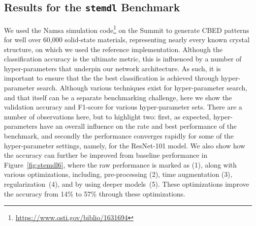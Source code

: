 \subsection{Results for the {\tt stemdl} Benchmark}

We used the Namsa simulation code\footnote{\url{https://www.osti.gov/biblio/1631694}} on the Summit to generate CBED patterns for well over  60,000 solid-state materials, representing nearly every known crystal structure, on which we used the reference implementation. Although the classification accuracy is the ultimate metric, this is influenced by a number of hyper-parameters that underpin our network architecture. As such, it is important to ensure that the the best classification is achieved through hyper-parameter search. Although various techniques exist for hyper-parameter search, and that itself can be a separate benchmarking challenge, here we show the validation accuracy and F1-score for various hyper-parameter sets. There are a number of observations here, but to highlight two: first, as expected, hyper-parameters have an overall influence on the rate and best performance of the benchmark, and secondly the performance converges rapidly for some of the hyper-parameter settings, namely, for the ResNet-101 model. We also show how the accuracy can further be improved from baseline performance in Figure~\ref{fig:stemdl6}, where the raw performance is marked as (1), along with various optimizations, including,   pre-processing (2),  time augmentation (3), regularization~(4), and by using deeper models~(5). These optimizations improve the accuracy from 14\% to 57\% through these optimizations. 





